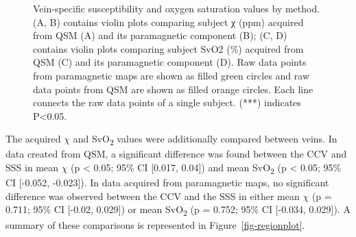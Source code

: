\documentclass[
sn-nature
]{sn-jnl}
\begin{document}
\begin{figure}[H]


\caption{\label{fig-methodplot}Vein-specific susceptibility and oxygen
saturation values by method. (A, B) contains violin plots comparing
subject χ (ppm) acquired from QSM (A) and its paramagnetic component
(B); (C, D) contains violin plots comparing subject SvO2 (\%) acquired
from QSM (C) and its paramagnetic component (D). Raw data points from
paramagnetic maps are shown as filled green circles and raw data points
from QSM are shown as filled orange circles. Each line connects the raw
data points of a single subject. (***) indicates P\textless0.05.}

\end{figure}%

The acquired \(\chi\) and SvO\textsubscript{2} values were additionally
compared between veins. In data created from QSM, a significant
difference was found between the CCV and SSS in mean \(\chi\) (p
\textless{} 0.05; 95\% CI {[}0.017, 0.04{]}) and mean
SvO\textsubscript{2} (p \textless{} 0.05; 95\% CI {[}-0.052, -0.023{]}).
In data acquired from paramagnetic maps, no significant difference was
observed between the CCV and the SSS in either mean \(\chi\) (p = 0.711;
95\% CI {[}-0.02, 0.029{]}) or mean SvO\textsubscript{2} (p = 0.752;
95\% CI {[}-0.034, 0.029{]}). A summary of these comparisons is
represented in Figure~\ref{fig-regionplot}.
\end{document}
